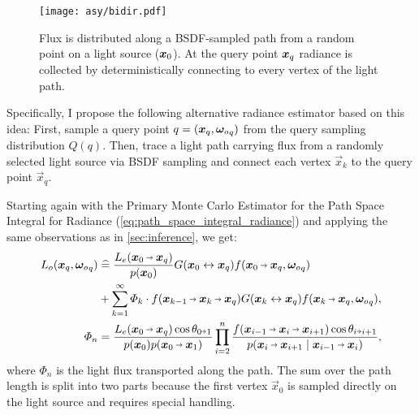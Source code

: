 \begin{figure}[ht]
    \centering
    \texttt{[image: asy/bidir.pdf]}
    \caption{Flux is distributed along a BSDF-sampled path from a random point on a light source ($\bm{x}_0$). At the query point $\bm{x}_q$ radiance is collected by deterministically connecting to every vertex of the light path.}
    \label{fig:bidir}
\end{figure}
Specifically, I propose the following alternative radiance estimator based on this idea:
First, sample a query point $q = (\bm{x}_q, {\bm{\omega}_o}_q)$ from the query sampling distribution $Q(q)$.
Then, trace a light path carrying flux from a randomly selected light source via BSDF sampling and connect each vertex $\vec{x}_k$ to the query point $\vec{x}_q$.

Starting again with the Primary Monte Carlo Estimator for the Path Space Integral for Radiance (\autoref{eq:path_space_integral_radiance}) and applying the same observations as in \autoref{sec:inference}, we get:
\begin{equation}
\label{eq:bidir}
\begin{aligned}
    L_o(\vec{x}_q, \wo_q)
    &\hateq \frac{L_e(\pdir{0}{q})}{p(\x_0)} \G{0}{q} f(\pdir{0}{q}, \wo_q) \\
    &+ \sum_{k=1}^{\infty} \Phi_k \cdot \f{k-1}{k}{q} \G{k}{q} f(\pdir{k}{q}, \wo_q), \\
    \Phi_n &= \frac{L_e(\pdir{0}{q}) \cos \theta_{0 \veryshortarrow 1}}{p(\x_0) p(\pdir{0}{1})} \prod_{i=2}^{n} \frac{f(\ptrip{i-1}{i}{i+1}) \cos \theta_{i \veryshortarrow i+1}}{p(\pdir{i}{i+1} \mid \pdir{i-1}{i})},
\end{aligned}
\end{equation}
where $\Phi_n$ is the light flux transported along the path.
The sum over the path length is split into two parts because the first vertex $\vec{x}_0$ is sampled directly on the light source and requires special handling.

